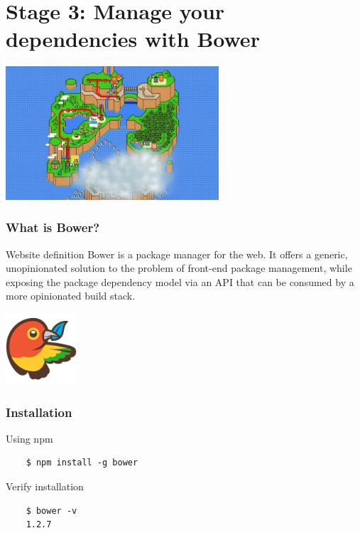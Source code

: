 \section{Stage 3: Manage your dependencies with Bower}

\begin{frame}[fragile]
  \begin{center}
    \includegraphics[width=300px]{images/map_stage_3.png}
  \end{center}
\end{frame}

\begin{frame}[fragile]
  \frametitle{What is Bower?}
  \begin{block}{Website definition}
    Bower is a package manager for the web. It offers a generic, unopinionated solution to the problem of front-end package management, while exposing the package dependency model via an API that can be consumed by a more opinionated build stack. 
  \end{block}

  \begin{center}
    \includegraphics[width=100px]{images/bower-logo.png}
  \end{center}
\end{frame}

\begin{frame}[fragile]
  \frametitle{Installation}

  \begin{block}{Using npm}
  {\scriptsize
    \begin{verbatim}
    $ npm install -g bower
    \end{verbatim}
  }
  \end{block}

  \pause

  \begin{block}{Verify installation}
  {\scriptsize
    \begin{verbatim}
    $ bower -v
    1.2.7
    \end{verbatim}
  }
  \end{block}
\end{frame}


